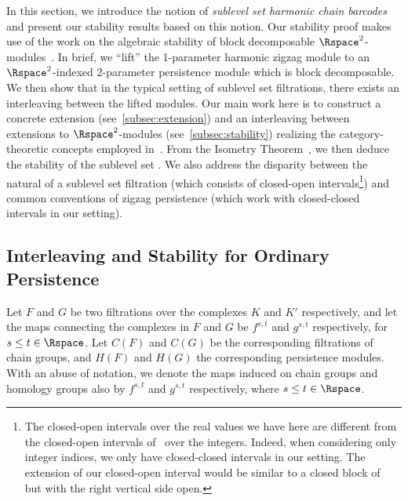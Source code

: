 In this section, we introduce the notion of \emph{sublevel set harmonic chain barcodes} and present our stability results based on this notion.
Our stability proof makes use of the work on the algebraic stability of block decomposable $\Rspace^2$-modules~\cite{bjerkevik2021stability,botnan2018algebraic}. 
In brief, we ``lift'' the 1-parameter harmonic zigzag module to an $\Rspace^2$-indexed 2-parameter persistence module which is block decomposable. 
We then show that in the typical setting of sublevel set filtrations, there exists an interleaving between the lifted modules. Our main work here is to construct a concrete extension (see~\cref{subsec:extension}) and an interleaving between extensions to $\Rspace^2$-modules (see~\cref{subsec:stability}) realizing the category-theoretic concepts employed in~\cite{bjerkevik2021stability,botnan2018algebraic}. From the Isometry Theorem~\cite{bauer2014induced,botnan2018algebraic}, we then deduce the stability of the sublevel set {\hcb}.
We also address the disparity between the natural {\hcb} of a sublevel set filtration (which consists of closed-open intervals\footnote{The closed-open intervals over the real values we have here are different from the closed-open intervals of~\cite{bjerkevik2021stability,botnan2018algebraic} over the integers. Indeed, when considering only integer indices, we only have closed-closed intervals in our setting. The extension of our closed-open interval would be similar to a closed block of~\cite{botnan2018algebraic} but with the right vertical side open.}) and common conventions of zigzag persistence (which work with closed-closed intervals in our setting).  

\subsection{Interleaving and Stability for Ordinary Persistence} \label{subsec:ordinaryinterleaving}


Let $F$ and $G$ be two filtrations over the complexes $K$ and $K'$ respectively, and let the maps connecting the complexes in $F$ and $G$ be $f^{s,t}$ and $g^{s,t}$ respectively, for  $s\leq t \in \Rspace$. Let $C(F)$ and $C(G)$ be the corresponding filtrations of chain groups, and $H(F)$ and $H(G)$ the corresponding persistence modules. With an abuse of notation, we denote the maps induced on chain groups and homology groups also by $f^{s,t}$ and $g^{s,t}$ respectively, where $s\leq t \in \Rspace$.

